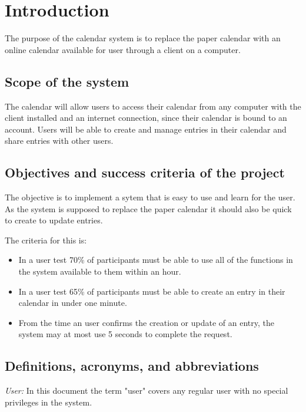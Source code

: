 \section{Introduction}
The purpose of the calendar system is to replace the paper calendar with an online calendar available for user through a client on a computer. 
\subsection{Scope of the system}
The calendar will allow users to access their calendar from any computer with the client installed and an internet connection, since their calendar is bound to an account. Users will be able to create and manage entries in their calendar and share entries with other users.
\subsection{Objectives and success criteria of the project}
The objective is to implement a sytem that is easy to use and learn for the user. As the system is supposed to replace the paper calendar it should also be quick to create to update entries.

The criteria for this is:
\begin{itemize}
\item In a user test 70\% of participants must be able to use all of the functions in the system available to them within an hour.
\item In a user test 65\% of participants must be able to create an entry in their calendar in under one minute.
\item From the time an user confirms the creation or update of an entry, the system may at most use 5 seconds to complete the request.
\end{itemize}
\subsection{Definitions, acronyms, and abbreviations}
\textit{User:} In this document the term "user" covers any regular user with no special privileges in the system.
